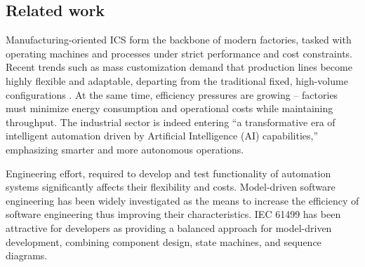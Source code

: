 \begin{bibunit}
    
    
    \section{ Related work}
    \label{sec:background}
    
    Manufacturing-oriented ICS form the backbone of modern factories, tasked with operating machines and processes under strict performance and cost constraints. Recent trends such as mass customization demand that production lines become highly flexible and adaptable, departing from the traditional fixed, high-volume configurations \cite{9576342}. At the same time, efficiency pressures are growing – factories must minimize energy consumption and operational costs while maintaining throughput. The industrial sector is indeed entering “a transformative era of intelligent automation driven by Artificial Intelligence (AI) capabilities,” emphasizing smarter and more autonomous operations\cite{10677409}. 
    
    Engineering effort, required to develop and test functionality of automation systems significantly affects their flexibility and costs. Model-driven software engineering has been widely investigated as the means to increase the efficiency of software engineering thus improving their characteristics. IEC 61499 has been attractive for developers as providing a balanced approach for model-driven development, combining component design, state machines, and sequence diagrams.
    

\end{bibunit}
